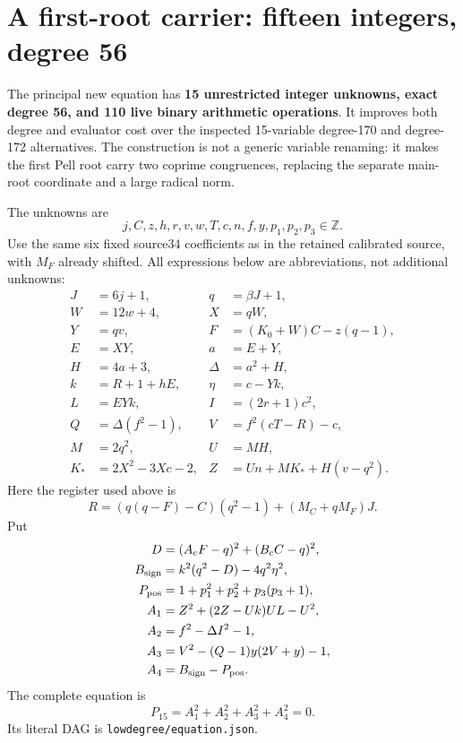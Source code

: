 \section{A first-root carrier: fifteen integers, degree 56}
\label{sec:first-carrier}
The principal new equation has \textbf{15 unrestricted integer unknowns,
exact degree 56, and 110 live binary arithmetic operations}.  It improves
both degree and evaluator cost over the inspected 15-variable degree-170
and degree-172 alternatives.  The construction is not a generic variable
renaming: it makes the first Pell root carry two coprime congruences, replacing
the separate main-root coordinate and a large radical norm.

The unknowns are
\[
 j,C,z,h,r,v,w,T,c,n,f,y,p_1,p_2,p_3\in\mathbb Z.
\]
Use the same six fixed source34 coefficients as in the retained calibrated
source, with $M_F$ already shifted.  All expressions below are abbreviations,
not additional unknowns:
\begin{align*}
 J&=6j+1,&q&=\beta J+1,\\
 W&=12w+4,&X&=qW,\\
 Y&=qv,&F&=(K_0+W)C-z(q-1),\\
 E&=XY,&a&=E+Y,\\
 H&=4a+3,&\Delta&=a^2+H,\\
 k&=R+1+hE,&\eta&=c-Yk,\\
 L&=EYk,&I&=(2r+1)c^2,\\
 Q&=\Delta(f^2-1),&V&=f^2(cT-R)-c,\\
 M&=2q^2,&U&=MH,\\
 K_*&=2X^2-3Xc-2,&Z&=Un+MK_*+H(v-q^2).
\end{align*}
Here the register used above is
\[
 R=(q(q-F)-C)(q^2-1)+(M_C+qM_F)J.
\]
Put
\begin{align*}
 D&=(A_c F-q)^2+(B_c C-q)^2,\\
 B_{\rm sign}&=k^2(q^2-D)-4q^2\eta^2,\\
 P_{\rm pos}&=1+p_1^2+p_2^2+p_3(p_3+1),\\
 A_1&=Z^2+(2Z-Uk)UL-U^2,\\
 A_2&=f^2-\Delta I^2-1,\\
 A_3&=V^2-(Q-1)y(2V+y)-1,\\
 A_4&=B_{\rm sign}-P_{\rm pos}.
\end{align*}
The complete equation is
\begin{equation}\label{eq:carrier15}
 \boxed{P_{15}=A_1^2+A_2^2+A_3^2+A_4^2=0.}
\end{equation}
Its literal DAG is \texttt{lowdegree/equation.json}.

